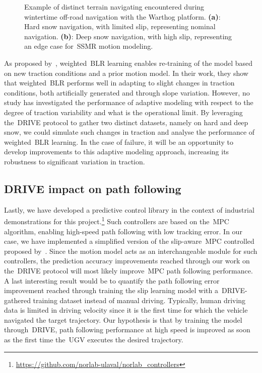 \documentclass[12pt,letterpaper,oneside]{article}
\begin{document}
\begin{figure}[h!]
\begin{center}
\begin{subfigure}[b]{0.49\textwidth}
			\caption{}
			\label{fig:deep_snow}
		\end{subfigure}%
		\caption{
			Example of distinct terrain navigating encountered during wintertime off-road navigation with the Warthog platform.
			\textbf{(a)}: Hard snow navigation, with limited slip, representing nominal navigation.
			\textbf{(b)}: Deep snow navigation, with high slip, representing an edge case for~\ac{SSMR} motion modeling.
		}
		\label{fig:snow_var}
	\end{center}
\end{figure}

As proposed by~\citet{Mckinnon2019}, weighted~\ac{BLR} learning enables re-training of the model based on new traction conditions and a prior motion model.
In their work, they show that weighted~\ac{BLR} performs well in adapting to slight changes in traction conditions, both artificially generated and through slope variation.
However, no study has investigated the performance of adaptive modeling with respect to the degree of traction variability and what is the operational limit.
By leveraging the~\ac{DRIVE} protocol to gather two distinct datasets, namely on hard and deep snow, we could simulate such changes in traction and analyse the performance of weighted~\ac{BLR} learning. %
In the case of failure, it will be an opportunity to develop improvements to this adaptive modeling approach, increasing its robustness to significant variation in traction.

\subsection{\ac{DRIVE} impact on path following}
Lastly, we have developed a predictive control library in the context of industrial demonstrations for this project.\footnote{\url{https://github.com/norlab-ulaval/norlab_controllers}}
Such controllers are based on the~\ac{MPC} algorithm, enabling high-speed path following with low tracking error.
In our case, we have implemented a simplified version of the slip-aware~\ac{MPC} controlled proposed by~\citet{Hewing2020}.
Since the motion model acts as an interchangeable module for such controllers, the prediction accuracy improvements reached through our work on the~\ac{DRIVE} protocol will most likely improve~\ac{MPC} path following performance.
A last interesting result would be to quantify the path following error improvement reached through training the slip learning model with a~\ac{DRIVE}-gathered training dataset instead of manual driving.
Typically, human driving data is limited in driving velocity since it is the first time for which the vehicle navigated the target trajectory.
Our hypothesis is that by training the model through~\ac{DRIVE}, path following performance at high speed is improved as soon as the first time the~\ac{UGV} executes the desired trajectory.
\end{document}
